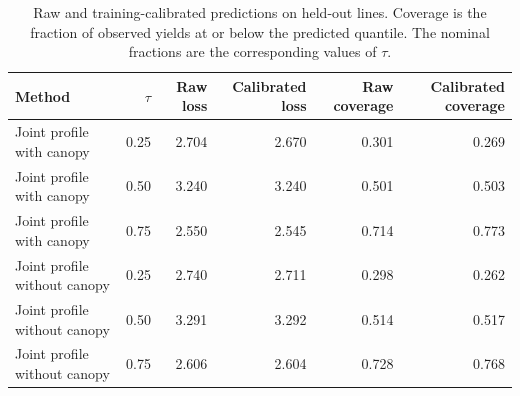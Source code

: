 \begin{table}[t]
\centering
\footnotesize
\caption{Raw and training-calibrated predictions on held-out lines. Coverage is the fraction of observed yields at or below the predicted quantile. The nominal fractions are the corresponding values of $\tau$.}
\label{tab:soy-prediction-details}
\begin{tabular}{lrrrrr}
\toprule
Method & $\tau$ & Raw loss & Calibrated loss & Raw coverage & Calibrated coverage \\
\midrule
Joint profile with canopy & 0.25 & 2.704 & 2.670 & 0.301 & 0.269 \\
Joint profile with canopy & 0.50 & 3.240 & 3.240 & 0.501 & 0.503 \\
Joint profile with canopy & 0.75 & 2.550 & 2.545 & 0.714 & 0.773 \\
Joint profile without canopy & 0.25 & 2.740 & 2.711 & 0.298 & 0.262 \\
Joint profile without canopy & 0.50 & 3.291 & 3.292 & 0.514 & 0.517 \\
Joint profile without canopy & 0.75 & 2.606 & 2.604 & 0.728 & 0.768 \\
\bottomrule
\end{tabular}
\end{table}

